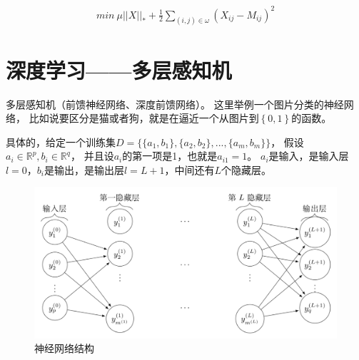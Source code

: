 \documentclass{article}
\begin{document}
\begin{equation}
    \begin{aligned}
        min \ \mu ||X||_* +\frac{1}{2}\sum_{(i,j)\in\omega}(X_{ij}-M_{ij})^2
    \end{aligned}
\end{equation}
\section{深度学习——多层感知机}

多层感知机（前馈神经网络、深度前馈网络）。
这里举例一个图片分类的神经网络，
比如说要区分是猫或者狗，就是在逼近一个从图片到$ \left\{ 0,1 \right\} $的函数。

具体的，给定一个训练集$D=\{ \{a_1,b_1\} , \{a_2,b_2\},...,\{ a_m,b_m\} \}$，
假设$a_i \in \mathbb{R}^p,b_i \in \mathbb{R}^q$，
并且设$a_i$的第一项是1，也就是$a_{i1}=1$。
$a_i$是输入，是输入层$l=0$，$b_i$是输出，是输出层$l=L+1$，中间还有$L$个隐藏层。

\begin{figure}[h]
    \centering
    \includegraphics[scale=0.4]{2.png}
    \caption{神经网络结构}
    \end{figure}
\end{document}
